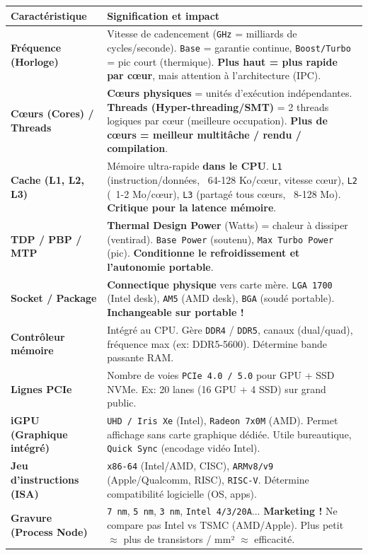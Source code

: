 \documentclass[11pt]{article}
\begin{document}
\begin{center}
\begin{tabularx}{\linewidth}{|l|X|}
\hline
\rowcolor{popblueL}
\textbf{Caractéristique} & \textbf{Signification et impact} \\
\hline
\textbf{Fréquence (Horloge)} & Vitesse de cadencement (\texttt{GHz} = milliards de cycles/seconde). \texttt{Base} = garantie continue, \texttt{Boost/Turbo} = pic court (thermique). \textbf{Plus haut = plus rapide par cœur}, mais attention à l'architecture (IPC). \\
\hline
\textbf{Cœurs (Cores) / Threads} & \textbf{Cœurs physiques} = unités d'exécution indépendantes. \textbf{Threads (Hyper-threading/SMT)} = 2 threads logiques par cœur (meilleure occupation). \textbf{Plus de cœurs = meilleur multitâche / rendu / compilation}. \\
\hline
\textbf{Cache (L1, L2, L3)} & Mémoire ultra-rapide \textbf{dans le CPU}. \texttt{L1} (instruction/données, ~64-128 Ko/cœur, vitesse cœur), \texttt{L2} (~1-2 Mo/cœur), \texttt{L3} (partagé tous cœurs, ~8-128 Mo). \textbf{Critique pour la latence mémoire}. \\
\hline
\textbf{TDP / PBP / MTP} & \textbf{Thermal Design Power} (Watts) = chaleur à dissiper (ventirad). \texttt{Base Power} (soutenu), \texttt{Max Turbo Power} (pic). \textbf{Conditionne le refroidissement et l'autonomie portable}. \\
\hline
\textbf{Socket / Package} & \textbf{Connectique physique} vers carte mère. \texttt{LGA 1700} (Intel desk), \texttt{AM5} (AMD desk), \texttt{BGA} (soudé portable). \textbf{Inchangeable sur portable !} \\
\hline
\textbf{Contrôleur mémoire} & Intégré au CPU. Gère \texttt{DDR4} / \texttt{DDR5}, canaux (dual/quad), fréquence max (ex: DDR5-5600). Détermine bande passante RAM. \\
\hline
\textbf{Lignes PCIe} & Nombre de voies \texttt{PCIe 4.0 / 5.0} pour GPU + SSD NVMe. Ex: 20 lanes (16 GPU + 4 SSD) sur grand public. \\
\hline
\textbf{iGPU (Graphique intégré)} & \texttt{UHD / Iris Xe} (Intel), \texttt{Radeon 7x0M} (AMD). Permet affichage sans carte graphique dédiée. Utile bureautique, \texttt{Quick Sync} (encodage vidéo Intel). \\
\hline
\textbf{Jeu d'instructions (ISA)} & \texttt{x86-64} (Intel/AMD, CISC), \texttt{ARMv8/v9} (Apple/Qualcomm, RISC), \texttt{RISC-V}. Détermine compatibilité logicielle (OS, apps). \\
\hline
\textbf{Gravure (Process Node)} & \texttt{7 nm}, \texttt{5 nm}, \texttt{3 nm}, \texttt{Intel 4/3/20A}... \textbf{Marketing !} Ne compare pas Intel vs TSMC (AMD/Apple). Plus petit $\approx$ plus de transistors / mm² $\approx$ efficacité. \\
\hline
\end{tabularx}
\end{center}
\end{document}
